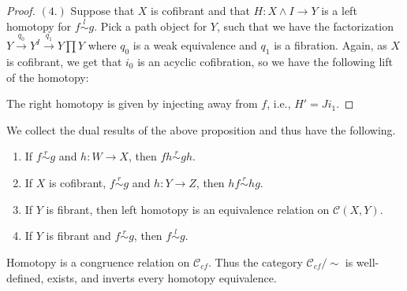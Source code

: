 \documentclass[../thesis.tex]{subfiles}
\begin{document}
\begin{proof}
                $(4.)$ Suppose that $X$ is cofibrant and that $H:X\wedge I\rightarrow Y$ is a left homotopy for $f \overset{l}{\sim} g$. Pick a path object for $Y$, such that we have the factorization $Y\overset{q_0}{\rightarrow}Y^I\overset{q_1}{\rightarrow}Y\prod Y$ where $q_0$ is a weak equivalence and $q_1$ is a fibration. Again, as $X$ is cofibrant, we get that $i_0$ is an acyclic cofibration, so we have the following lift of the homotopy:
                \begin{center}
                \end{center}
                The right homotopy is given by injecting away from $f$, i.e., $H' = Ji_1$.
            \end{proof}

            \begin{corollary}\label{cor: basic-homotopy-op}
                We collect the dual results of the above proposition and thus have the following.
                \begin{enumerate}
                    \item If $f \overset{r}{\sim}g$ and $h: W \rightarrow X$, then $fh \overset{r}{\sim} gh$.
                    \item If $X$ is cofibrant, $f \overset{r}{\sim} g$ and $h: Y \rightarrow Z$, then $hf \overset{r}{\sim} hg$.
                    \item If $Y$ is fibrant, then left homotopy is an equivalence relation on $\mathcal{C}(X, Y)$.
                    \item If $Y$ is fibrant and $f \overset{r}{\sim} g$, then $f \overset{l}{\sim} g$.
                \end{enumerate}
            \end{corollary}

            \begin{corollary}\label{cor: homotopy-is-eq-rel}
                Homotopy is a congruence relation on $\mathcal{C}_{cf}$. Thus the category $\mathcal{C}_{cf}/\sim$ is well-defined, exists, and inverts every homotopy equivalence.
            \end{corollary}
\end{document}
